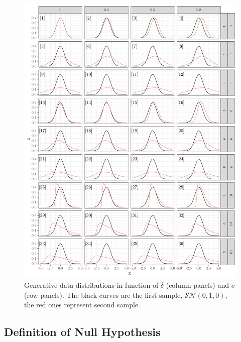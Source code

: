 \documentclass[10pt]{article}\usepackage[]{graphicx}\usepackage[]{xcolor}
\makeatletter
\def\maxwidth{ %
  \ifdim\Gin@nat@width>\linewidth
    \linewidth
  \else
    \Gin@nat@width
  \fi
}
\newenvironment{knitrout}{}{} %
\makeatother
\begin{document}
\begin{knitrout}
\color{fgcolor}\begin{figure}

{\centering \includegraphics[width=\maxwidth]{figure/alpha0-1} 

}

\caption[ Generative data distributions in function of $\delta$ (column panels) and $\sigma$ (row panels)]{ Generative data distributions in function of $\delta$ (column panels) and $\sigma$ (row panels). The black curves are the first sample, $\mathcal{SN}(0,1,0)$, the red ones represent second sample.}\label{fig:alpha0}
\end{figure}

\end{knitrout}

\subsection{Definition of Null Hypothesis}
\end{document}

